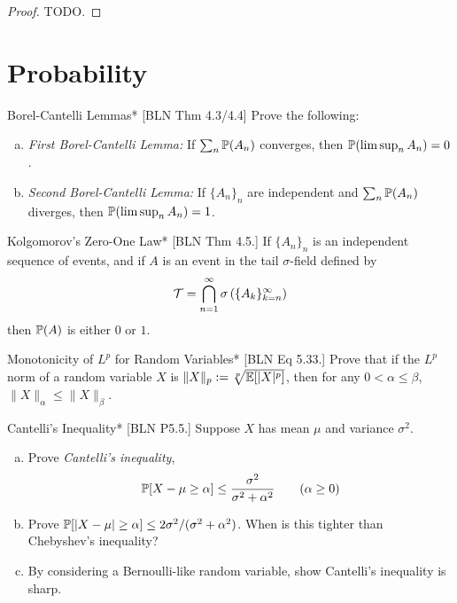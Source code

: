 \begin{proof}
    TODO. 
\end{proof}


\newpage
\section{Probability}


\begin{problem}{Borel-Cantelli Lemmas}*
    [BLN Thm 4.3/4.4] Prove the following: 
    \begin{enumerate}[(a)]
        \itemsep0em
        \item \emph{First Borel-Cantelli Lemma:} If $\sum_n \mathbb{P}(A_n)$ converges, then $\mathbb{P}(\limsup_n A_n) = 0$. 
        \item \emph{Second Borel-Cantelli Lemma:} If $\{A_n\}_n$ are independent and $\sum_n \mathbb{P}(A_n)$ diverges, then $\mathbb{P}(\limsup_n A_n) = 1$. 
    \end{enumerate}
\end{problem}


\begin{problem}{Kolgomorov's Zero-One Law}*
    [BLN Thm 4.5.] If $\{A_n\}_n$ is an independent sequence of events, and if $A$ is an event in the tail $\sigma$-field defined by 
    $$
        \mathcal{T} = \bigcap_{n=1}^\infty \sigma \left( \{A_k\}_{k=n}^\infty \right)
    $$
    then $\mathbb{P}(A)$ is either $0$ or $1$. 
\end{problem}


\begin{problem}{Monotonicity of $L^p$ for Random Variables}*
    [BLN Eq 5.33.] Prove that if the $L^p$ norm of a random variable $X$ is $\|X\|_p := \sqrt[p]{\mathbb{E}[|X|^p]}$, then for any $0 < \alpha \leq \beta$, $\|X\|_\alpha \leq \|X\|_\beta$. 
\end{problem}


\begin{problem}{Cantelli's Inequality}*
    [BLN P5.5.] Suppose $X$ has mean $\mu$ and variance $\sigma^2$. 
    \begin{enumerate}[(a)]
        \itemsep0em
        \item Prove \emph{Cantelli's inequality}, 
        $$
            \mathbb{P}[X - \mu \geq \alpha] \leq \frac{\sigma^2}{\sigma^2 + \alpha^2}
            \qquad (\alpha \geq 0)
        $$
        \item Prove $\mathbb{P}[|X - \mu| \geq \alpha] \leq 2\sigma^2 / (\sigma^2 + \alpha^2)$. When is this tighter than Chebyshev's inequality? 
        \item By considering a Bernoulli-like random variable, show Cantelli's inequality is sharp. 
    \end{enumerate}
\end{problem}


